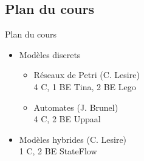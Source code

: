 \documentclass[compress]{beamer}
\begin{document}
\subsection{Plan du cours}
\begin{frame}{Plan du cours}
\begin{itemize}
\item Modèles discrets
	\begin{itemize}
	\item Réseaux de Petri (C. Lesire)\\
		\small 4 C, 1 BE Tina, 2 BE Lego
	\item Automates (J. Brunel)\\
		\small 4 C, 2 BE Uppaal
	\end{itemize}
\item Modèles hybrides (C. Lesire)\\
	\small 1 C, 2 BE StateFlow
\end{itemize}
\end{frame}
\end{document}
